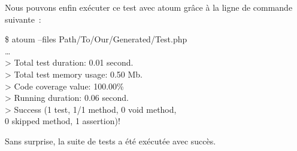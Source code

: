 \begin{example}
\noindent Nous pouvons enfin exécuter ce test avec atoum grâce à la ligne de
commande suivante~:
%
\begin{pre}
\$ atoum --files Path/To/Our/Generated/Test.php \\
… \\
> Total test duration: 0.01 second. \\
> Total test memory usage: 0.50 Mb. \\
> Code coverage value: 100.00\% \\
> Running duration: 0.06 second. \\
> Success (1 test, 1/1 method, 0 void method, \\
           0 skipped method, 1 assertion)!
\end{pre}
%
Sans surprise, la suite de tests a été exécutée avec succès.

\end{example}
